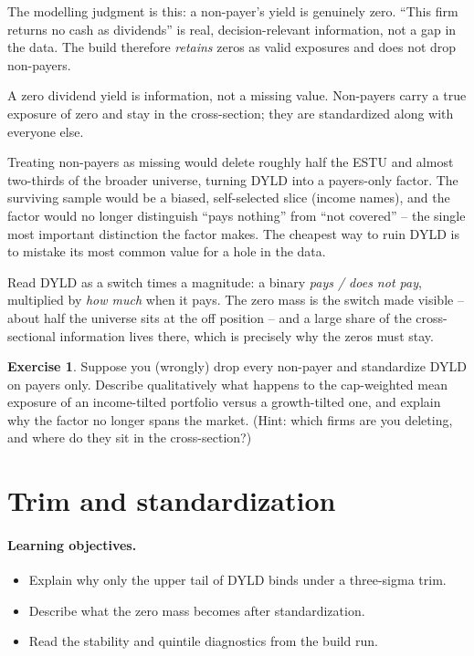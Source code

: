 \documentclass[11pt]{article}
\theoremstyle{definition}
\newtheorem{exercise}{Exercise}[section]
\theoremstyle{plain}
\theoremstyle{remark}
\begin{document}
The modelling judgment is this: a non-payer's yield is genuinely zero. ``This firm returns no cash as dividends'' is real, decision-relevant information, not a gap in the data. The build therefore \emph{retains} zeros as valid exposures and does not drop non-payers.

\begin{keyresult}
A zero dividend yield is information, not a missing value. Non-payers carry a true exposure of zero and stay in the cross-section; they are standardized along with everyone else.
\end{keyresult}

\begin{pitfall}
Treating non-payers as missing would delete roughly half the ESTU and almost two-thirds of the broader universe, turning DYLD into a payers-only factor. The surviving sample would be a biased, self-selected slice (income names), and the factor would no longer distinguish ``pays nothing'' from ``not covered'' -- the single most important distinction the factor makes. The cheapest way to ruin DYLD is to mistake its most common value for a hole in the data.
\end{pitfall}

\begin{intuition}
Read DYLD as a switch times a magnitude: a binary \emph{pays / does not pay}, multiplied by \emph{how much} when it pays. The zero mass is the switch made visible -- about half the universe sits at the off position -- and a large share of the cross-sectional information lives there, which is precisely why the zeros must stay.
\end{intuition}

\begin{exercise}
Suppose you (wrongly) drop every non-payer and standardize DYLD on payers only. Describe qualitatively what happens to the cap-weighted mean exposure of an income-tilted portfolio versus a growth-tilted one, and explain why the factor no longer spans the market. (Hint: which firms are you deleting, and where do they sit in the cross-section?)
\end{exercise}

\section{Trim and standardization}\label{sec:std}

\paragraph{Learning objectives.}
\begin{itemize}[leftmargin=1.4em,topsep=2pt]
  \item Explain why only the upper tail of DYLD binds under a three-sigma trim.
  \item Describe what the zero mass becomes after standardization.
  \item Read the stability and quintile diagnostics from the build run.
\end{itemize}
\end{document}
